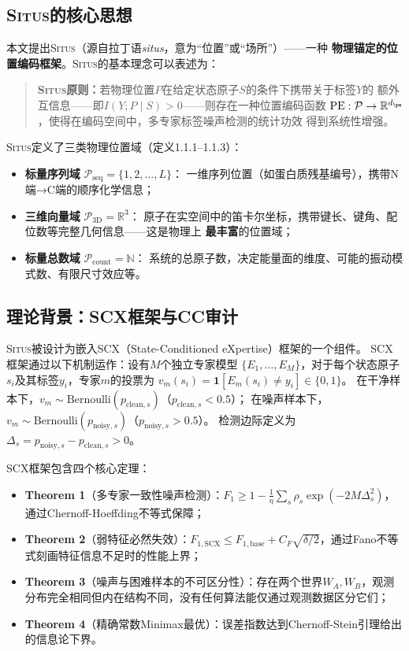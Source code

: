 \documentclass[11pt,a4paper]{article}
\theoremstyle{remark}
\DeclareMathOperator{\PE}{PE}
\newcommand{\R}{\mathbb{R}}
\newcommand{\N}{\mathbb{N}}
\newcommand{\Ppos}{\mathcal{P}}
\newcommand{\Situs}{\textsc{Situs}}
\begin{document}
\subsection{\Situs{}的核心思想}

本文提出\Situs{}（源自拉丁语\textit{situs}，意为``位置''或``场所''）——一种
\textbf{物理锚定的位置编码框架}。\Situs{}的基本理念可以表述为：

\begin{quote}
    \textbf{\Situs{}原则：}若物理位置$P$在给定状态原子$S$的条件下携带关于标签$Y$的
    额外互信息——即$I(Y; P \mid S) > 0$——则存在一种位置编码函数
    $\PE: \Ppos \to \R^{d_{\pe}}$，使得在编码空间中，多专家标签噪声检测的统计功效
    得到系统性增强。
\end{quote}

\Situs{}定义了三类物理位置域（定义1.1.1--1.1.3）：
\begin{itemize}
    \item \textbf{标量序列域} $\Ppos_{\text{seq}} = \{1, 2, \ldots, L\}$：
          一维序列位置（如蛋白质残基编号），携带N端→C端的顺序化学信息；
    \item \textbf{三维向量域} $\Ppos_{\text{3D}} = \R^3$：
          原子在实空间中的笛卡尔坐标，携带键长、键角、配位数等完整几何信息——这是物理上
          \textbf{最丰富}的位置域；
    \item \textbf{标量总数域} $\Ppos_{\text{count}} = \N$：
          系统的总原子数，决定能量面的维度、可能的振动模式数、有限尺寸效应等。
\end{itemize}

\subsection{理论背景：SCX框架与CC审计}

\Situs{}被设计为嵌入SCX（State-Conditioned eXpertise）框架的一个组件。
SCX框架通过以下机制运作\cite{scx2026theorems}：设有$M$个独立专家模型
$\{E_1, \ldots, E_M\}$，对于每个状态原子$s_i$及其标签$y_i$，专家$m$的投票为
$v_m(s_i) = \mathbf{1}[E_m(s_i) \neq y_i] \in \{0, 1\}$。
在干净样本下，$v_m \sim \text{Bernoulli}(p_{\text{clean}, s})$（$p_{\text{clean}, s} < 0.5$）；
在噪声样本下，$v_m \sim \text{Bernoulli}(p_{\text{noisy}, s})$（$p_{\text{noisy}, s} > 0.5$）。
检测边际定义为$\Delta_s = p_{\text{noisy}, s} - p_{\text{clean}, s} > 0$。

SCX框架包含四个核心定理\cite{scx2026cc_audit}：
\begin{itemize}
    \item \textbf{Theorem 1}（多专家一致性噪声检测）：$F_1 \geq 1 - \frac{1}{\eta}\sum_s \rho_s \exp(-2M\Delta_s^2)$，通过Chernoff-Hoeffding不等式保障；
    \item \textbf{Theorem 2}（弱特征必然失效）：$F_{1,\text{SCX}} \leq F_{1,\text{base}} + C_F\sqrt{\delta/2}$，通过Fano不等式刻画特征信息不足时的性能上界；
    \item \textbf{Theorem 3}（噪声与困难样本的不可区分性）：存在两个世界$W_A, W_B$，观测分布完全相同但内在结构不同，没有任何算法能仅通过观测数据区分它们；
    \item \textbf{Theorem 4}（精确常数Minimax最优）：误差指数达到Chernoff-Stein引理给出的信息论下界。
\end{itemize}
\end{document}
